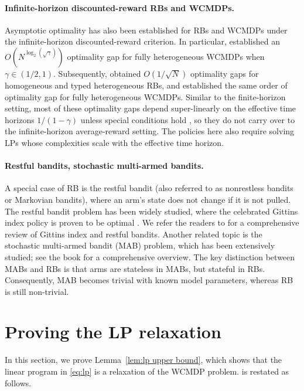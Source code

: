 \paragraph{Infinite-horizon discounted-reward RBs and WCMDPs.}
Asymptotic optimality has also been established for RBs and WCMDPs under the infinite-horizon discounted-reward criterion. 
In particular, \citet{BroSmi_19_rb} established an $O(N^{\log_2 (\sqrt{\gamma})})$ optimality gap for fully heterogeneous WCMDPs when $\gamma \in (1/2, 1)$. Subsequently, \citet{ZhaFra_22_discounted_rb,GhoNagJaiTam_23_finite_discount}  obtained $O(1/\sqrt{N})$ optimality gaps for homogeneous and typed heterogeneous RBs, and \citet{BroZha_23} established the same order of optimality gap for fully heterogeneous WCMDPs. 
Similar to the finite-horizon setting, most of these optimality gaps depend super-linearly on the effective time horizons $1/(1-\gamma)$ unless special conditions hold \citep{BroZha_23}, so they do not carry over to the infinite-horizon average-reward setting. 
The policies here also require solving LPs whose complexities scale with the effective time horizon. 


\paragraph{Restful bandits, stochastic multi-armed bandits.}
A special case of RB is the restful bandit (also referred to as nonrestless bandits or Markovian bandits), where an arm's state does not change if it is not pulled.
The restful bandit problem has been widely studied, where the celebrated Gittins index policy is proven to be optimal \citep{GitJon_74,Git_79,BerNin_96,Tsi_94,Web_92,VarWalBuy_85,Whi_80}. We refer the readers to \citep{GitGlaWeb_11} for a comprehensive review of Gittins index and restful bandits. 
Another related topic is the stochastic multi-armed bandit (MAB) problem, which has been extensively studied; see the book \citep{LatSze_20} for a comprehensive overview. 
The key distinction between MABs and RBs is that arms are stateless in MABs, but stateful in RBs. Consequently, MAB becomes trivial with known model parameters, whereas RB is still non-trivial. 





\section{Proving the LP relaxation}\label{app:proof-lem-lp-upper-bound}
In this section, we prove Lemma~\ref{lem:lp upper bound}, which shows that the linear program in \eqref{eq:lp} is a relaxation of the WCMDP problem.  is restated as follows.  

